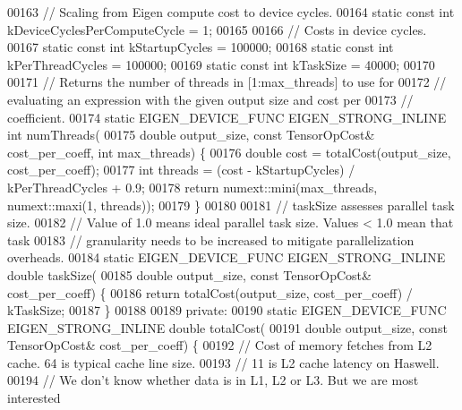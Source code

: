 \begin{DoxyCode}
00163   \textcolor{comment}{// Scaling from Eigen compute cost to device cycles.}
00164   \textcolor{keyword}{static} \textcolor{keyword}{const} \textcolor{keywordtype}{int} kDeviceCyclesPerComputeCycle = 1;
00165 
00166  \textcolor{comment}{// Costs in device cycles.}
00167   \textcolor{keyword}{static} \textcolor{keyword}{const} \textcolor{keywordtype}{int} kStartupCycles = 100000;
00168   \textcolor{keyword}{static} \textcolor{keyword}{const} \textcolor{keywordtype}{int} kPerThreadCycles = 100000;
00169   \textcolor{keyword}{static} \textcolor{keyword}{const} \textcolor{keywordtype}{int} kTaskSize = 40000;
00170 
00171   \textcolor{comment}{// Returns the number of threads in [1:max\_threads] to use for}
00172   \textcolor{comment}{// evaluating an expression with the given output size and cost per}
00173   \textcolor{comment}{// coefficient.}
00174   \textcolor{keyword}{static} EIGEN\_DEVICE\_FUNC EIGEN\_STRONG\_INLINE \textcolor{keywordtype}{int} numThreads(
00175       \textcolor{keywordtype}{double} output\_size, \textcolor{keyword}{const} TensorOpCost& cost\_per\_coeff, \textcolor{keywordtype}{int} max\_threads) \{
00176     \textcolor{keywordtype}{double} cost = totalCost(output\_size, cost\_per\_coeff);
00177     \textcolor{keywordtype}{int} threads = (cost - kStartupCycles) / kPerThreadCycles + 0.9;
00178     \textcolor{keywordflow}{return} numext::mini(max\_threads, numext::maxi(1, threads));
00179   \}
00180 
00181   \textcolor{comment}{// taskSize assesses parallel task size.}
00182   \textcolor{comment}{// Value of 1.0 means ideal parallel task size. Values < 1.0 mean that task}
00183   \textcolor{comment}{// granularity needs to be increased to mitigate parallelization overheads.}
00184   \textcolor{keyword}{static} EIGEN\_DEVICE\_FUNC EIGEN\_STRONG\_INLINE \textcolor{keywordtype}{double} taskSize(
00185       \textcolor{keywordtype}{double} output\_size, \textcolor{keyword}{const} TensorOpCost& cost\_per\_coeff) \{
00186     \textcolor{keywordflow}{return} totalCost(output\_size, cost\_per\_coeff) / kTaskSize;
00187   \}
00188 
00189  \textcolor{keyword}{private}:
00190   \textcolor{keyword}{static} EIGEN\_DEVICE\_FUNC EIGEN\_STRONG\_INLINE \textcolor{keywordtype}{double} totalCost(
00191       \textcolor{keywordtype}{double} output\_size, \textcolor{keyword}{const} TensorOpCost& cost\_per\_coeff) \{
00192     \textcolor{comment}{// Cost of memory fetches from L2 cache. 64 is typical cache line size.}
00193     \textcolor{comment}{// 11 is L2 cache latency on Haswell.}
00194     \textcolor{comment}{// We don't know whether data is in L1, L2 or L3. But we are most interested}

\end{DoxyCode}
